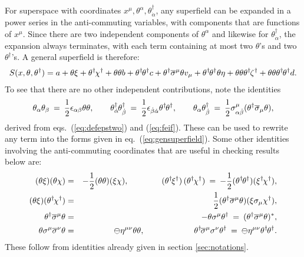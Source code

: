 \documentclass[12pt]{article}
\def\BDpos{}
\def\thetasigmamuthetadagger{\theta\sigma^\mu\theta^\dagger}
\def\thetasigmamuloweredthetadagger{\theta\sigma_\mu\theta^\dagger}
\def\BDpos{-}
\def\thetasigmamuthetadagger{\theta^\dagger\sigmabar^\mu\theta}
\def\thetasigmamuloweredthetadagger{\theta^\dagger\sigmabar_\mu\theta}
\def\BDpos{\oplus}
\def\thetasigmamuthetadagger{\theta\sigma^\mu\theta^\dagger}
\def\thetasigmamuloweredthetadagger{\theta\sigma_\mu\theta^\dagger}
\def\BDpos{\ominus}
\def\thetasigmamuthetadagger{\theta^\dagger\sigmabar^\mu\theta}
\def\thetasigmamuloweredthetadagger{\theta^\dagger\sigmabar_\mu\theta}
\newcommand{\thdthd}{\theta^\dagger\hspace{-1pt}\theta^\dagger}
\def\beq{\begin{eqnarray}}
\def\eeq{\end{eqnarray}}
\def\sigmabar{\overline\sigma}
\begin{document}
For superspace with coordinates $x^\mu, \theta^\alpha, \theta^\dagger_{\dot\alpha}$,
any superfield can be expanded in a power series in the anti-commuting variables, with components
that are functions of $x^\mu$. Since there are two 
independent components of $\theta^\alpha$ and 
likewise for $\theta^\dagger_{\dot\alpha}$, the expansion always 
terminates, with each term containing at 
most two $\theta$'s and two $\theta^\dagger$'s.
A general superfield is therefore:
\beq
S(x, \theta, \theta^\dagger) = 
a
+ \theta \xi 
+ \theta^\dagger\hspace{-1pt} \chi^\dagger 
+ \theta\theta b 
+ \thdthd c 
+ \thetasigmamuthetadagger v_\mu 
+ \thdthd  \theta \eta 
+ \theta \theta  \theta^\dagger\hspace{-1pt} \zeta^\dagger 
+ \theta\theta\thdthd d.
\label{eq:gensuperfield}
\eeq
To see that there are no other independent contributions, note the identities
\beq
\theta_\alpha \theta_\beta \>=\> \frac{1}{2} \epsilon_{\alpha\beta} \theta\theta
,
\qquad
\theta^\dagger_{\dot \alpha}\hspace{-1pt} \theta^\dagger_{\dot \beta} 
\>=\> \frac{1}{2} \epsilon_{\dot\beta\dot\alpha} 
\thdthd
,
\qquad
\theta_\alpha 
\theta^\dagger_{\dot\beta} 
\>=\> \frac{1}{2} 
\sigma^\mu_{\alpha\dot\beta}
(\thetasigmamuloweredthetadagger)
,
\eeq
derived from eqs.~(\ref{eq:defepstwo}) and (\ref{eq:feif}). 
These can be used to rewrite any term into the forms given
in eq.~(\ref{eq:gensuperfield}).
Some other identities involving the anti-commuting coordinates that are 
useful in checking results below are:
\beq
(\theta \xi)( \theta\chi) 
&=& -\frac{1}{2}(\theta\theta)( \xi\chi)
,
\qquad\qquad
(\theta^\dagger 
\hspace{-1pt} 
\xi^\dagger)
\, 
(\theta^\dagger 
\hspace{-1pt}
\chi^\dagger)
\>=\> 
-\frac{1}{2}(\thdthd ) (\xi^\dagger\hspace{-1pt}\chi^\dagger)
,
\\
(\theta \xi )(\theta^\dagger
\hspace{-1pt} 
\chi^\dagger )
&=&
\frac{1}{2} (\thetasigmamuthetadagger )
(\xi \sigma_\mu \chi^\dagger ),
\\
\theta^\dagger \sigmabar^\mu \theta &=& -\theta \sigma^\mu \theta^\dagger 
\>=\> 
(\theta^\dagger \sigmabar^\mu \theta)^*,
\\
\theta \sigma^\mu \sigmabar^\nu \theta &=& 
\BDpos\eta^{\mu\nu} \theta\theta ,
\qquad\qquad\qquad
\theta^\dagger\hspace{-1pt} \sigmabar^\mu \sigma^\nu \theta^\dagger \>=\> 
\BDpos\eta^{\mu\nu} \thdthd.
\eeq
These follow from identities already given in section 
\ref{sec:notations}.
\end{document}

